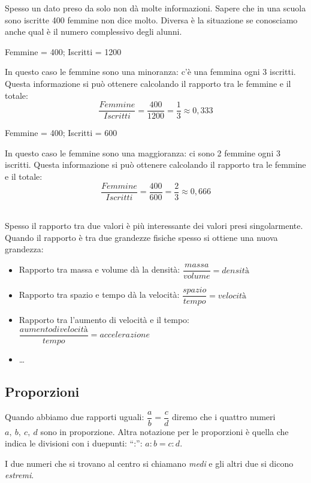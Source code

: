 Spesso un dato preso da solo non dà molte informazioni. Sapere che in una 
scuola sono iscritte 400 femmine non dice molto. Diversa è la situazione se 
conosciamo anche qual è il numero complessivo degli alunni.

\begin{minipage}{.49\textwidth}
 Femmine = 400; \quad Iscritti = 1200
 
 In questo caso le femmine sono una minoranza: c'è una femmina ogni 3 
iscritti. Questa informazione si può ottenere calcolando il rapporto tra le 
femmine e il totale:
\[\frac{Femmine}{Iscritti} = \frac{400}{1200} = \frac{1}{3} \approx 0,333\]
\end{minipage}
\begin{minipage}{.49\textwidth}
 Femmine = 400; \quad Iscritti = 600
 
 In questo caso le femmine sono una maggioranza: ci sono 2 femmine ogni 3 
iscritti. Questa informazione si può ottenere calcolando il rapporto tra le 
femmine e il totale:
\[\frac{Femmine}{Iscritti} = \frac{400}{600} = \frac{2}{3} \approx 0,666\]
\end{minipage}\\

Spesso il rapporto tra due valori è più interessante dei valori presi 
singolarmente. 
Quando il rapporto è tra due grandezze fisiche spesso si 
ottiene una nuova grandezza:
\begin{itemize}
 \item Rapporto tra massa e volume dà la densità: 
 \(\dfrac{massa}{volume}=densità\)
 \item Rapporto tra spazio e tempo dà la velocità: 
 \(\dfrac{spazio}{tempo}=velocità\)
 \item Rapporto tra l'aumento di velocità e il tempo: 
 \(\dfrac{aumento di velocità}{tempo}=accelerazione\)
 \item \dots
\end{itemize}

\subsection{Proporzioni}

Quando abbiamo due rapporti uguali: \(\dfrac{a}{b} = \dfrac{c}{d}\) diremo 
che i quattro numeri \(a,~b,~c,~d\) sono in proporzione. Altra notazione 
per le proporzioni è quella che indica le divisioni con i duepunti: ``:'':
\(a:b=c:d\).

I due numeri che si trovano al centro si chiamano \emph{medi} e gli altri 
due si dicono \emph{estremi}.

